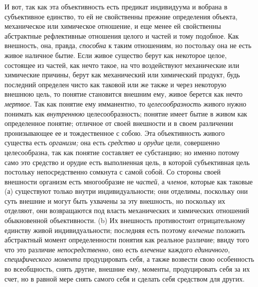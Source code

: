 И вот, так как эта объективность есть предикат индивидуума и
вобрана в субъективное единство, то ей не свойственны прежние определения
объекта, механическое или химическое отношение, и еще менее ей свойственны
абстрактные рефлективные отношения целого и частей и тому подобное. Как
внешность, она, правда, {\em способна}
к таким отношениям, но постольку она не есть живое наличное
бытие. Если живое существо берут как некоторое целое, состоящее из частей,
как нечто такое, на что воздействуют механические или химические причины,
берут как механический или химический продукт, будь последний определен
чисто как таковой или же также и через некоторую внешнюю
цель, то понятие становится внешним ему, живое берется как нечто
{\em мертвое}. Так как
понятие ему имманентно, то
{\em целесообразность}
живого нужно понимать как
{\em внутреннюю}
целесообразность; понятие имеет бытие в живом как
определенное понятие; отличное от своей внешности и в своем различении
пронизывающее ее и тождественное с собою. Эта объективность живого существа
есть {\em организм;} она есть {\em средство и орудие}
цели, совершенно целесообразна, так как понятие составляет ее
субстанцию; но именно потому само это средство и орудие есть выполненная
цель, в которой субъективная цель постольку непосредственно сомкнута с
самой собой. Со стороны своей внешности организм есть многообразие не
{\em частей}, а
{\em членов}, которые как
таковые (а) существуют только внутри индивидуальности; они отделимы,
поскольку они суть внешние и могут быть ухвачены за эту внешность, но
поскольку их отделяют, они возвращаются под власть механических и
химических отношений обыкновенной объективности. (b) Их внешность
противостоит отрицательному единству живой индивидуальности; последняя есть
поэтому {\em влечение}
положить абстрактный момент определенности понятия как
реальное различие; ввиду того что это различие
{\em непосредственно},
оно есть {\em влечение}
каждого {\em единичного},
{\em специфического момента}
продуцировать себя, а также возвести свою особенность во
всеобщность, снять другие, внешние ему, моменты, продуцировать себя за их
счет, но в равной мере снять самого себя и сделать себя средством для
других.

